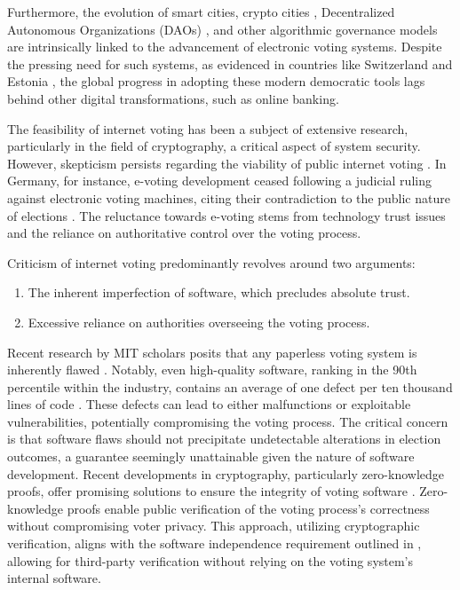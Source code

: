 \documentclass[runningheads]{llncs}
\begin{document}
Furthermore, the evolution of smart cities, crypto cities \cite{buterinCryptoCities2021}, Decentralized Autonomous Organizations (DAOs) \cite{wangDecentralizedAutonomousOrganizations2019}, and other algorithmic governance models \cite{GovernmentAlgorithm2022} are intrinsically linked to the advancement of electronic voting systems. Despite the pressing need for such systems, as evidenced in countries like Switzerland \cite{ElectronicVotingSwitzerland2023} and Estonia \cite{ElectronicVotingEstonia2023}, the global progress in adopting these modern democratic tools lags behind other digital transformations, such as online banking.

The feasibility of internet voting has been a subject of extensive research, particularly in the field of cryptography, a critical aspect of system security. However, skepticism persists regarding the viability of public internet voting \cite{parkGoingBadWorse2021, mearianWhyBlockchainbasedVoting2019, shanklandNoBlockchainIsn2018, leeBlockchainbasedElectionsWould2018, schneierBlockchainVoting2020, schneierBlockchainTrust2019}. In Germany, for instance, e-voting development ceased following a judicial ruling against electronic voting machines, citing their contradiction to the public nature of elections \cite{ElectronicVotingCountry2023}. The reluctance towards e-voting stems from technology trust issues and the reliance on authoritative control over the voting process.

Criticism of internet voting predominantly revolves around two arguments:

\begin{enumerate}
\item The inherent imperfection of software, which precludes absolute trust.
\item Excessive reliance on authorities overseeing the voting process.
\end{enumerate}

Recent research by MIT scholars posits that any paperless voting system is inherently flawed \cite{parkGoingBadWorse2021}. Notably, even high-quality software, ranking in the 90th percentile within the industry, contains an average of one defect per ten thousand lines of code \cite{llaguno2017CoverityScan2017}. These defects can lead to either malfunctions or exploitable vulnerabilities, potentially compromising the voting process. The critical concern is that software flaws should not precipitate undetectable alterations in election outcomes, a guarantee seemingly unattainable given the nature of software development.
Recent developments in cryptography, particularly zero-knowledge proofs, offer promising solutions to ensure the integrity of voting software \cite{parnoPinocchioNearlyPractical2013}. Zero-knowledge proofs enable public verification of the voting process's correctness without compromising voter privacy. This approach, utilizing cryptographic verification, aligns with the software independence requirement outlined in \cite{parkGoingBadWorse2021}, allowing for third-party verification without relying on the voting system's internal software.
\end{document}
